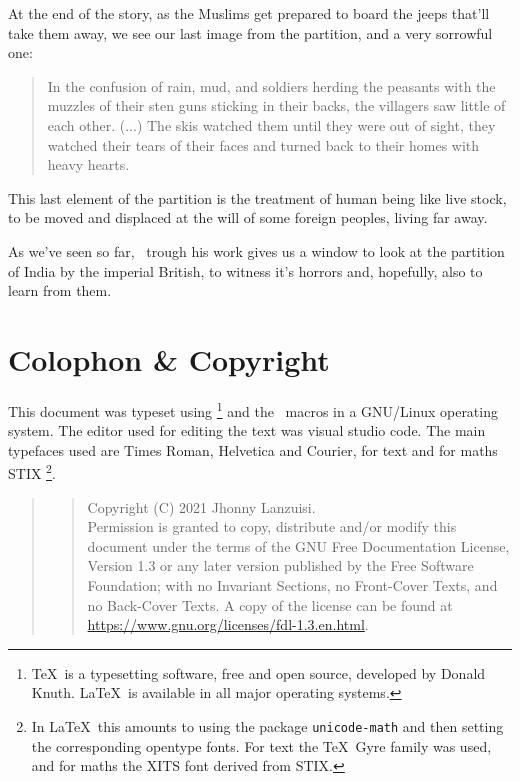 \documentclass{scrartcl}
\let\oldtoc\tableofcontents
\renewcommand{\tableofcontents}{{\renewcommand{\sffamily}{\rmfamily}\oldtoc}}
\newcommand{\icode}[1]{\verb~#1~}
\begin{document}
At the end of the story, as the Muslims get prepared
to board the jeeps that'll take them away,
we see our last image from the partition, and
a very sorrowful one:
\begin{quote}
  In the confusion of rain, mud, and soldiers
  herding the peasants with the muzzles of their sten guns
  sticking in their backs, the villagers saw little of each other.
  (...)
  The skis watched them until they were out of sight,
  they watched their tears of their faces and turned back to
  their homes with heavy hearts.
  \cite[p. 185, para. 1]{khushwant_singh_train_1990}
\end{quote}
This last element of the partition is the treatment
of human being like live stock, to be moved and displaced
at the will of some foreign peoples,
living far away.

As we've seen so far,
\ks\ trough his work gives us a window
to look at the partition of India
by the imperial British,
to witness it's horrors and,
hopefully,
also to learn from them.
%
\printbibliography
\newpage
\section*{Colophon \& Copyright}
This document was typeset using \LuaTeX\footnote{\TeX\ is
a typesetting software, free and open source,
developed by Donald Knuth. \LaTeX\ is available in
all major operating systems.}
and the \LaTeXe\ macros in a GNU/Li\-nux operating system.
The editor used for editing the text was visual studio code.
The main typefaces used are Times Roman,
Helvetica and Courier, for text and for maths
STIX%
\footnote{In \LaTeX\ this amounts to using the package
\icode{unicode-math} and then setting the corresponding
opentype fonts. For text the \TeX\ Gyre family was used,
and for maths the XITS font derived from STIX.}.
\medskip
\begin{quote}\footnotesize
  \begin{quote}
  Copyright (C)  2021 Jhonny Lanzuisi.\\
  Permission is granted to copy, distribute and/or modify this document
  under the terms of the GNU Free Documentation License, Version 1.3
  or any later version published by the Free Software Foundation;
  with no Invariant Sections, no Front-Cover Texts, and no Back-Cover Texts.
  A copy of the license can be found at\\
  \url{https://www.gnu.org/licenses/fdl-1.3.en.html}.\par
  \end{quote}
\end{quote}
\newpage
\tableofcontents
\end{document}
